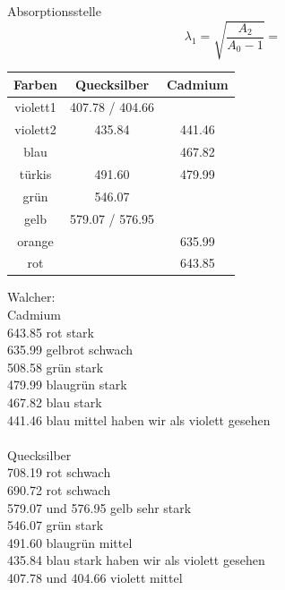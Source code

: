 Absorptionsstelle \[ \lambda_1 = \sqrt{\frac{A_2}{A_0-1}} =  \]


\clearpage


\begin{table}
\centering
\begin{tabular}{c|c|c}
	Farben & Quecksilber & Cadmium \\
	\hline
	violett1 & 407.78 / 404.66 & \\
	violett2 & 435.84 & 441.46 \\
	blau &  & 467.82 \\
	türkis & 491.60 & 479.99 \\
	grün & 546.07 & \\
	gelb & 579.07 / 576.95 & \\
	orange &  & 635.99 \\
	rot &  & 643.85 \\
\end{tabular}
\end{table}
Walcher: \\
Cadmium \\
643.85	rot			stark \\
635.99	gelbrot		schwach \\
508.58	grün		stark \\
479.99	blaugrün	stark \\
467.82	blau		stark \\
441.46	blau		mittel \qquad haben wir als violett gesehen \\
\ \\
Quecksilber \\
708.19	rot			schwach \\
690.72	rot			schwach \\
579.07 und 576.95	gelb		sehr stark \\
546.07	grün		stark \\
491.60	blaugrün	mittel \\
435.84	blau		stark \qquad haben wir als violett gesehen \\
407.78 und 404.66	violett		mittel \\